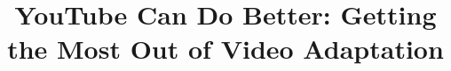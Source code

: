 
\usepackage[utf8]{inputenc}
\usepackage{lmodern}
\usepackage[T1]{fontenc}
\usepackage[american]{babel}
\usepackage{amsmath}
\usepackage{amssymb}
\usepackage{microtype}

\usepackage{tikz,pgfplots}
\usetikzlibrary{arrows}
\usetikzlibrary{decorations.markings}
\pgfplotsset{compat=1.10} 
\usepackage{tikzscale}
\usepackage{booktabs}
\usepackage{nicefrac}
\usepackage{units}
\usepackage{tabu}
\usepackage{csquotes}
\usepackage[binary-units=true]{siunitx}
\usepackage[np]{numprint}
\usepackage{graphicx}
\usepackage{subfigure}
\npstyleenglish

\usepackage{balance}

%

\usepackage[url=true,doi=false,backend=biber,style=ieee,sorting=none,maxnames=3]{biblatex}


\newcommand{\picwidth}{0.49\columnwidth}


\title{YouTube Can Do Better: Getting the Most Out of Video Adaptation}


